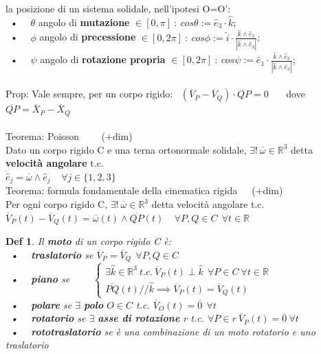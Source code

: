 \documentclass{article}
\theoremstyle{unnumbered}
\newtheorem* {theoremT}{Def}
\theoremstyle{unnumbered1}
\newenvironment{defi}{\begin{gBox}\begin{theoremT}}{\end{theoremT}\end{gBox}}
\begin{document}
la posizione di un sistema solidale, nell'ipotesi O=O':\\
%
%
\ • \ \ $\theta$ angolo di \textbf{mutazione} $\in [0,\pi]\ :\ cos\theta := \hat{e}_3\cdot\hat{k}$; \\
\ • \ \ $\phi$ angolo di \textbf{precessione} $\in [0,2\pi]\ :\ cos\phi := \hat{i}\cdot\frac{\hat{k}\wedge\hat{e}_3}{|\hat{k}\wedge\hat{e}_3|}$; \\
\ • \ \ $\psi$ angolo di \textbf{rotazione propria} $\in [0,2\pi]\ :\ cos\psi := \hat{e}_1\cdot\frac{\hat{k}\wedge\hat{e}_3}{|\hat{k}\wedge\hat{e}_3|}$; \\
\phantom{}\\
%
%
%
Prop: Vale sempre, per un corpo rigido: \ $(\overline{V}_P-\overline{V}_Q)\cdot\overline{QP} = 0$ \ \ \ dove \ $\overline{QP}=\overline{X}_P-\overline{X}_Q$ \\
\phantom{}\\
%
%
%
Teorema: Poisson \ \ \ \ (+dim)\\
\phantom{\ } Dato un corpo rigido C e una terna ortonormale solidale, $\exists! \ \overline{\omega} \in \mathbb{R}^3$ detta \textbf{velocità angolare} t.c. \\
\phantom{} \hspace{2in} $ \dot{\hat{e}}_j = \overline{\omega}\wedge\hat{e}_j \ \ \ \ \ \forall j \in \{1,2,3\}$ \\
%
%
%
Teorema: formula fondamentale della cinematica rigida\ \ \ (+dim)\\
\phantom{\ } Per ogni corpo rigido C, $\exists! \ \overline{\omega} \in \mathbb{R}^3$ detta velocità angolare t.c. \\
\phantom{} \hspace{1.4in} $\overline{V}_P(t)-\overline{V}_Q(t) = \overline{\omega}(t)\wedge\overline{QP}(t) \ \ \ \ \ \forall P,Q \in C \ \ \forall t \in \mathbb{R}$ \\
%
%
\begin{defi}
Il \textbf{moto} di un corpo rigido C è: \\
\ • \ \ \textbf{traslatorio} se $\overline{V}_P = \overline{V}_Q \ \ \forall P,Q \in C$ \\
\ • \ \ \textbf{piano} se \ \ \ \ $\begin{cases} 
\exists \hat{k} \in \mathbb{R}^3 \ t.c. \ \overline{V}_P(t) \perp \hat{k} \ \ \forall P\in C \ \forall t\in\mathbb{R} \\
\overline{PQ}(t) /\!\!/ \hat{k} \implies \overline{V}_P(t) = \overline{V}_Q(t)  \end{cases}$ \\
\ • \ \ \textbf{polare} se $\exists$ \textbf{polo} $O \in C$ t.c. $\overline{V}_O(t)=\overline{0} \ \ \forall t$ \\
\ • \ \ \textbf{rotatorio} se $\exists$ \textbf{asse di rotazione} r t.c. $\forall P \in r \ \overline{V}_P(t) = \overline{0} \ \forall t$ \\
\ • \ \ \textbf{rototraslatorio} se è una combinazione di un moto rotatorio e uno traslatorio
\end{defi}
\end{document}
